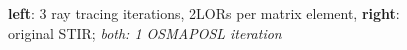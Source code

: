 \documentclass{beamer}
\begin{document}
\begin{frame}
  \begin{figure}
    \centering
    \caption{\textbf{left}: 3 ray tracing iterations, 2LORs per matrix element, \textbf{right}: original STIR; \textsl{both: 1 OSMAPOSL iteration}}
  \end{figure}
\end{frame}
\end{document}
